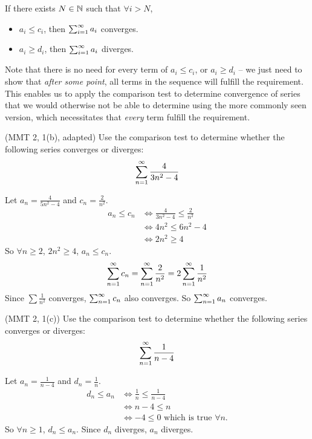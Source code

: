 \begin{test}
  If there exists $N \in \mathbb{N}$ such that $\forall i > N$,
  \begin{itemize}
    \item $a_i \leq c_i$, then $\sum_{i = 1} ^ \infty a_i$ converges.
    \item $a_i \geq d_i$, then $\sum_{i = 1} ^ \infty a_i$ diverges.
  \end{itemize}
\end{test}
Note that there is no need for every term of $a_i \leq c_i$, or $a_i \geq d_i$ -- we just need to show that \textit{after some point}, all terms in the sequence will fulfill the requirement. This enables us to apply the comparison test to determine convergence of series that we would otherwise not be able to determine using the more commonly seen version, which necessitates that \textit{every} term fulfill the requirement.
\begin{eg}
  (MMT 2, 1(b), adapted) Use the comparison test to determine whether the following series converges or diverges:
  \[
    \sum_{n = 1} ^ \infty \frac{4}{3n ^ 2 - 4}
  \]
\end{eg}
\begin{solution}
  Let $a_n = \frac{4}{5n ^ 2 - 4}$ and $c_n = \frac{2}{n ^ 2}$.
  \begin{align*}
    a_n \leq c_n &\iff \frac{4}{3n ^ 2 - 4} \leq \frac{2}{n ^ 2} \\
    &\iff 4n ^ 2 \leq 6n ^ 2 - 4 \\ 
    &\iff 2n ^ 2 \geq 4
  \end{align*}
  So $\forall n \geq 2$, $2n ^ 2 \geq 4$, $a_n \leq c_n$.
  \[
    \sum_{n = 1} ^ \infty c_n = \sum_{n = 1} ^ \infty \frac{2}{n ^ 2} = 2 \sum_{n = 1} ^ \infty \frac{1}{n ^ 2}
  \]
  Since $\sum \frac{1}{n ^ 2}$ converges, $\sum_{n = 1} ^ \infty c_n$ also converges. So $\sum_{n = 1} ^ \infty a_n$ converges.
\end{solution}
\begin{eg}
  (MMT 2, 1(c)) Use the comparison test to determine whether the following series converges or diverges:
  \[
    \sum_{n = 1} ^ \infty \frac{1}{n - 4}
  \]
\end{eg}
\begin{solution}
  Let $a_n = \frac{1}{n - 4}$ and $d_n = \frac{1}{n}$.
  \begin{align*}
    d_n \leq a_n &\iff \frac{1}{n} \leq \frac{1}{n - 4} \\ 
    &\iff n - 4 \leq n \\ 
    &\iff -4 \leq 0 \text{ which is true } \forall n.
  \end{align*}
  So $\forall n \geq 1$, $d_n \leq a_n$. Since $d_n$ diverges, $a_n$ diverges.
\end{solution}


